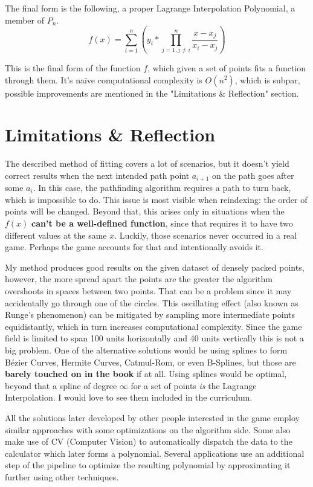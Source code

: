 \documentclass[12pt, titlepage]{article}
\begin{document}
The final form is the following, a proper Lagrange Interpolation Polynomial,
a member of $P_n$. 
\begin{equation}
f(x) = \sum_{i=1}^{n} \left(y_i * \prod_{j=1, j \neq i}^{n} \frac{x - x_j}{x_i - x_j}\right)
\end{equation}

This is the final form of the function $f$, which given a set of points 
fits a function through them. It's na\"ive computational complexity
is $O(n^2)$, which is subpar, possible improvements are mentioned in the 
"Limitations \& Reflection" section.

\section{Limitations \& Reflection}
The described method of fitting covers a lot of scenarios, but it doesn't yield 
correct results
when the next intended path point $a_{i + 1}$ on the path goes after 
some $a_i$. In this case, the pathfinding algorithm requires a path to turn back,
which is impossible to do. This issue is most visible when reindexing: the order
of points will be changed. Beyond that, this arises only in situations when the 
$f(x)$ \textbf{can't be a well-defined function}, since that requires it to have 
two different values at the same $x$. Luckily, those scenarios never occurred in a 
real game. Perhaps the game accounts for that and intentionally avoids it.

My method produces good results on the given dataset of densely packed points,
however, the more spread apart the points are the greater the algorithm
overshoots in spaces between two points\cite{lebesgue}. That can be a problem since it may 
accidentally go through one of the circles. This oscillating effect (also known as Runge's phenomenon\cite{runge}) can be
mitigated by sampling more intermediate points equidistantly, which in turn increases 
computational complexity. Since the game field is limited to span 100 units
horizontally and 40 units vertically this is not a big problem. One of the
alternative solutions would be using splines to form B\'{e}zier Curves, 
Hermite Curves, Catmul-Rom, or even B-Splines\cite{freya}, but those are \textbf{barely touched 
on in the book} if at all. Using splines would be optimal, beyond that
a spline of degree $\infty$ for a set of points \textit{is} the Lagrange
Interpolation. I would love to see them included in the 
curriculum.

All the solutions later developed by other people interested in the game employ
similar approaches with some optimizations on the algorithm side. Some also
make use of CV (Computer Vision) to automatically dispatch the data to the
calculator which later forms a polynomial. Several applications use
an additional step of the pipeline to optimize the resulting polynomial
by approximating it further using other techniques.
\end{document}
